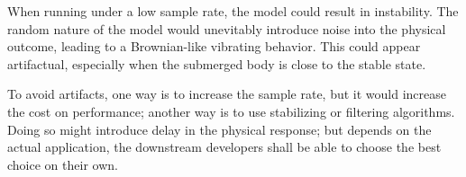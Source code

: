 When running under a low sample rate, the model could result in instability.
The random nature of the model would unevitably introduce noise into the physical outcome, leading to a Brownian-like vibrating behavior.
This could appear artifactual, especially when the submerged body is close to the stable state.

To avoid artifacts, one way is to increase the sample rate, but it would increase the cost on performance;
another way is to use stabilizing or filtering algorithms.
Doing so might introduce delay in the physical response;
but depends on the actual application, the downstream developers shall be able to choose the best choice on their own.

\begin{comment}
\section*{Postscripts and Acknowledgements}

This is the first time I have ever written a serious academical article.
It is guaranteed that there will be naive mistakes all over the place.
Please excuse me, thou reader.
If thou hast spotted any mistake, please feel free to contact me at \url{wangnianyi2001@outlook.com}.
My apologies in advance!

Thanks to the team of my graduation project, \emph{Nani Core} (\url{https://github.com/nani-core}).
The idea of this article rose when I was making the water system in the project.
They established the possibilty for this article to happen.
Special thanks to 陈恩晖 (Omnisch) and 张嘉玥 (Limko).
They are two really, really reliable co-workers and good friends of mine.
They have given me the greatest mental and physical support on the project, and an unforgetful memory in my graduation year.
\end{comment}

\begin{comment}
	\section*{Appendix}

	A sample project of the simulation experiment is published at \url{https://github.com/WangNianyi2001/Water-Simulation-2024}.
\end{comment}